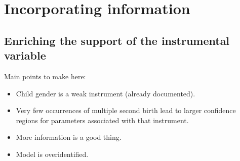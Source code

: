 \documentclass[10pt,a4paper,twoside]{article}
\newcommand\independent{\protect\mathpalette{\protect\independenT}{\perp}}
\def\independenT#1#2{\mathrel{\rlap{$#1#2$}\mkern2mu{#1#2}}}
\numberwithin{equation}{section}
\begin{document}
\section{Incorporating information}
\subsection{Enriching the support of the instrumental variable}
Main points to make here:
\begin{itemize}
\item Child gender is a weak instrument (already documented).
\item Very few occurrences of multiple second birth lead to larger confidence regions for parameters associated with that instrument.
\item More information is a good thing.
\item Model is overidentified.
\end{itemize}
\end{document}
